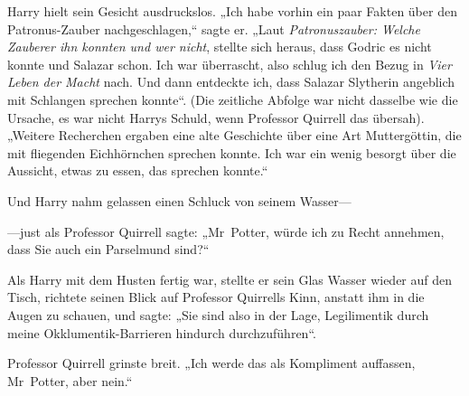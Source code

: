 Harry hielt sein Gesicht ausdruckslos. „Ich habe vorhin ein paar Fakten über den Patronus-Zauber nachgeschlagen,“ sagte er. „Laut \emph{Patronuszauber: Welche Zauberer ihn konnten und wer nicht}, stellte sich heraus, dass Godric es nicht konnte und Salazar schon. Ich war überrascht, also schlug ich den Bezug in \emph{Vier Leben der Macht} nach. Und dann entdeckte ich, dass Salazar Slytherin angeblich mit Schlangen sprechen konnte“. (Die zeitliche Abfolge war nicht dasselbe wie die Ursache, es war nicht Harrys Schuld, wenn Professor Quirrell das übersah). „Weitere Recherchen ergaben eine alte Geschichte über eine Art Muttergöttin, die mit fliegenden Eichhörnchen sprechen konnte. Ich war ein wenig besorgt über die Aussicht, etwas zu essen, das sprechen konnte.“

Und Harry nahm gelassen einen Schluck von seinem Wasser—

—just als Professor Quirrell sagte: „Mr~Potter, würde ich zu Recht annehmen, dass Sie auch ein Parselmund sind?“

Als Harry mit dem Husten fertig war, stellte er sein Glas Wasser wieder auf den Tisch, richtete seinen Blick auf Professor Quirrells Kinn, anstatt ihm in die Augen zu schauen, und sagte: „Sie sind also in der Lage, Legilimentik durch meine Okklumentik-Barrieren hindurch durchzuführen“.

Professor Quirrell grinste breit. „Ich werde das als Kompliment auffassen, Mr~Potter, aber nein.“

